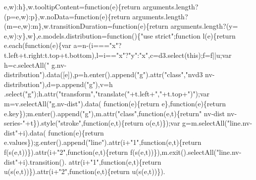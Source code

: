 \begin{DoxyCode}
      e,w):h\},w.tooltipContent=\textcolor{keyword}{function}(e)\{\textcolor{keywordflow}{return} arguments.length?(p=e,w):p\},w.noData=\textcolor{keyword}{function}(e)\{\textcolor{keywordflow}{return} 
      arguments.length?(m=e,w):m\},w.transitionDuration=\textcolor{keyword}{function}(e)\{\textcolor{keywordflow}{return} arguments.length?(y=
      e,w):y\},w\},e.models.distribution=\textcolor{keyword}{function}()\{\textcolor{stringliteral}{"use strict"};\textcolor{keyword}{function} l(e)\{\textcolor{keywordflow}{return} e.each(\textcolor{keyword}{function}(e)\{var 
      a=n-(i===\textcolor{stringliteral}{"x"}?t.left+t.right:t.top+t.bottom),l=i==\textcolor{stringliteral}{"x"}?\textcolor{stringliteral}{"y"}:\textcolor{stringliteral}{"x"},c=d3.select(\textcolor{keyword}{this});f=f||u;var h=c.selectAll(\textcolor{stringliteral}{"
      g.nv-distribution"}).data([e]),p=h.enter().append(\textcolor{stringliteral}{"g"}).attr(\textcolor{stringliteral}{"class"},\textcolor{stringliteral}{"nvd3 nv-distribution"}),d=p.append(\textcolor{stringliteral}{"g"}),v=h
      .select(\textcolor{stringliteral}{"g"});h.attr(\textcolor{stringliteral}{"transform"},\textcolor{stringliteral}{"translate("}+t.left+\textcolor{stringliteral}{","}+t.top+\textcolor{stringliteral}{")"});var m=v.selectAll(\textcolor{stringliteral}{"g.nv-dist"}).data(\textcolor{keyword}{
      function}(e)\{\textcolor{keywordflow}{return} e\},\textcolor{keyword}{function}(e)\{\textcolor{keywordflow}{return} e.key\});m.enter().append(\textcolor{stringliteral}{"g"}),m.attr(\textcolor{stringliteral}{"class"},\textcolor{keyword}{function}(e,t)\{\textcolor{keywordflow}{return}\textcolor{stringliteral}{"
      nv-dist nv-series-"}+t\}).style(\textcolor{stringliteral}{"stroke"},\textcolor{keyword}{function}(e,t)\{\textcolor{keywordflow}{return} o(e,t)\});var g=m.selectAll(\textcolor{stringliteral}{"line.nv-dist"}+i).data(\textcolor{keyword}{
      function}(e)\{\textcolor{keywordflow}{return} e.values\});g.enter().append(\textcolor{stringliteral}{"line"}).attr(i+\textcolor{stringliteral}{"1"},\textcolor{keyword}{function}(e,t)\{\textcolor{keywordflow}{return} 
      f(s(e,t))\}).attr(i+\textcolor{stringliteral}{"2"},\textcolor{keyword}{function}(e,t)\{\textcolor{keywordflow}{return} f(s(e,t))\}),m.exit().selectAll(\textcolor{stringliteral}{"line.nv-dist"}+i).transition().
      attr(i+\textcolor{stringliteral}{"1"},\textcolor{keyword}{function}(e,t)\{\textcolor{keywordflow}{return} u(s(e,t))\}).attr(i+\textcolor{stringliteral}{"2"},\textcolor{keyword}{function}(e,t)\{\textcolor{keywordflow}{return} u(s(e,t))\}).

\end{DoxyCode}
